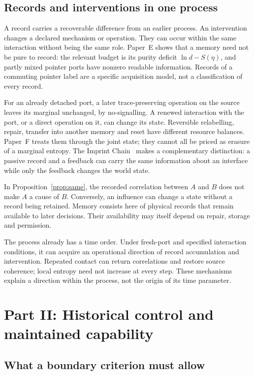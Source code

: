 \documentclass[11pt,a4paper]{article}
\begin{document}
\subsection{Records and interventions in one process}

A record carries a recoverable difference from an earlier process.
An intervention changes a declared mechanism or operation. They can occur
within the same interaction without being the same role.
Paper~E shows that a memory need not be pure to record: the relevant budget
is its purity deficit \(\ln d-S(\eta)\), and partly mixed pointer ports have
nonzero readable information. Records of a commuting pointer label are a
specific acquisition model, not a classification of every record.

For an already detached port, a later trace-preserving operation on the
source leaves its marginal unchanged, by no-signalling. A renewed
interaction with the port, or a direct operation on it, can change its
state. Reversible relabelling, repair, transfer into another memory and
reset have different resource balances. Paper~F treats them through the
joint state; they cannot all be priced as erasure of a marginal entropy.
The Imprint Chain~\cite{LiuImprintChain} makes a complementary distinction:
a passive record and a feedback can carry the same information about an
interface while only the feedback changes the world state.

In Proposition~\ref{prop:same}, the recorded correlation between \(A\) and
\(B\) does not make \(A\) a cause of \(B\). Conversely, an influence can
change a state without a record being retained. Memory consists here of
physical records that remain available to later decisions. Their
availability may itself depend on repair, storage and permission.

The process already has a time order. Under fresh-port and specified
interaction conditions, it can acquire an operational direction of record
accumulation and intervention. Repeated contact can return correlations
and restore source coherence; local entropy need not increase at every
step. These mechanisms explain a direction within the process, not the
origin of its time parameter.

\section{Part II: Historical control and maintained capability}
\label{sec:agency}

\subsection{What a boundary criterion must allow}
\end{document}
